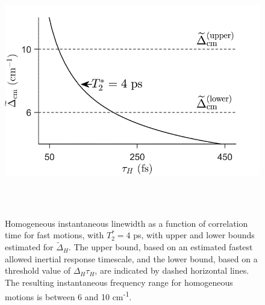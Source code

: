 \documentclass[]{article}
\begin{document}
\begin{figure}
  \centering
  \includegraphics[width=6.45821in,height=4.31466in]{figure4.png}
  \caption{Homogeneous instantaneous linewidth as a function of correlation time for fast motions, with \(T_{2}^{*} = 4\) ps, with upper and lower bounds estimated for \({\widetilde{\Delta}}_{H}\). The upper bound, based on an estimated fastest allowed inertial response timescale, and the lower bound, based on a threshold value of \(\Delta_{H}\tau_{H}\), are indicated by dashed horizontal lines. The resulting instantaneous frequency range for homogeneous motions is between 6 and 10 cm\textsuperscript{-1}.}
  \label{paper_03:fig4}
\end{figure}
\end{document}
